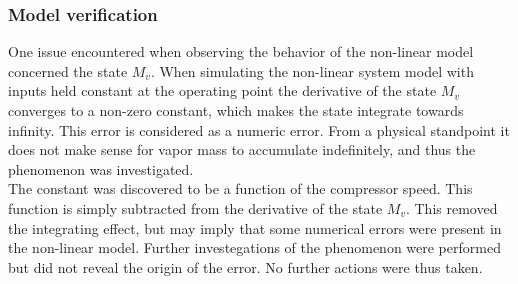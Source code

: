 \subsubsection{Model verification}
One issue encountered when observing the behavior of the non-linear model concerned the state $M_v$. When simulating the non-linear system model with inputs held constant at the operating point the derivative of the state $M_v$ converges to a non-zero constant, which makes the state integrate towards infinity. This error is considered as a numeric error. From a physical standpoint it does not make sense for vapor mass to accumulate indefinitely, and thus the phenomenon was investigated. \\

The constant was discovered to be a function of the compressor speed. This function is simply subtracted from the derivative of the state $M_v$. This removed the integrating effect, but may imply that some numerical errors were present in the non-linear model. Further investegations of the phenomenon were performed but did not reveal the origin of the error. No further actions were thus taken.





